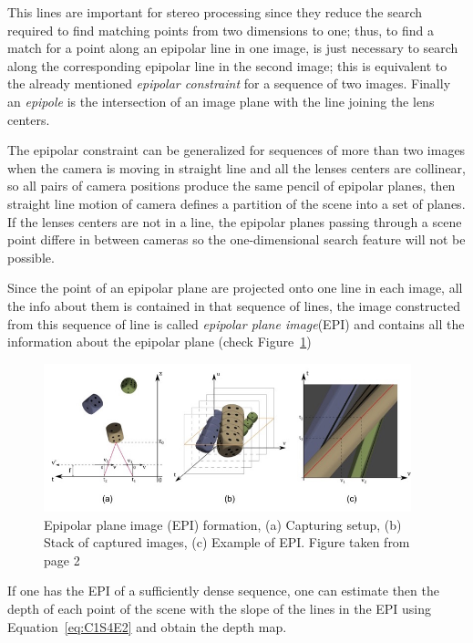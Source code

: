 \bigskip

This lines are important for stereo processing since they reduce the search required to find matching points from two dimensions to one; thus, to find a match for a point along an epipolar line in one image, is just necessary to search along the corresponding epipolar line in the second image; this is equivalent to the already mentioned \textit{epipolar constraint} for a sequence of two images. Finally an \textit{epipole} is the intersection of an image plane with the line joining the lens centers.

\bigskip

The epipolar constraint can be generalized for sequences of more than two images when the camera is moving in straight line and all the lenses centers are collinear, so all pairs of camera positions produce the same pencil of epipolar planes, then straight line motion of camera defines a partition of the scene into a set of planes. If the lenses centers are not in a line, the epipolar planes passing through a scene point differe in between cameras so the one-dimensional search feature will not be possible. 

\bigskip 

Since the point of an epipolar plane are projected onto one line in each image, all the info about them is contained in that sequence of lines, the image constructed from this sequence of line is called \textit{epipolar plane image}(EPI) and contains all the information about the epipolar plane (check Figure~\ref{fig:EPI-dices})

\begin{figure}[h!]
\centering
\includegraphics[width = 0.95\textwidth]{./Diagrams/EPI-dices.jpg}
\caption{Epipolar plane image (EPI) formation, (a) Capturing setup, (b) Stack of captured images, (c) Example of EPI\@. Figure taken from \cite{LF-Shearlets} page 2}
\label{fig:EPI-dices}
\end{figure}

If one has the EPI of a sufficiently dense sequence, one can estimate then the depth of each point of the scene with the slope of the lines in the EPI using Equation~\ref{eq:C1S4E2} and obtain the depth map. 

